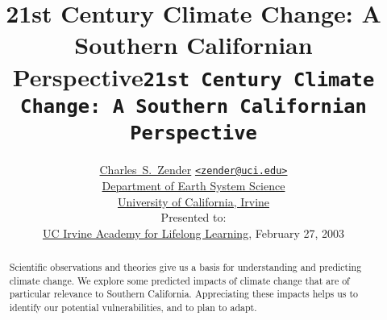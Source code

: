 \documentclass[12pt]{article}
\begin{document}

\begin{screen}
\title{\color{section0}\Huge 21st Century Climate Change: A Southern Californian Perspective}
\end{screen}

\begin{print}
\title{\Huge\texttt{21st Century Climate Change: A Southern Californian Perspective}}
\end{print}

\author{
\color{section1}\Large
\href{http://www.ess.uci.edu/~zender}{Charles~S.~Zender}
{\small\href{mailto:zender@uci.edu}{\color{section1}\texttt{<zender@uci.edu>}}}\\
\href{http://www.ess.uci.edu}{Department of Earth System Science}\\
\href{http://www.uci.edu}{University of California, Irvine}\\
Presented to:\\
\href{http://unex.uci.edu/all/}{UC Irvine Academy for Lifelong Learning}, February 27, 2003\\
} %


\date{} %
\maketitle
\begin{screen}
\vfill
\end{screen}

\begin{abstract}
\noindent Scientific observations and theories give us a basis
for understanding and predicting climate change.
We explore some predicted impacts of climate change that are of
particular relevance to Southern California.
Appreciating these impacts helps us to identify our potential
vulnerabilities, and to plan to adapt.
\end{abstract}
\end{document}
